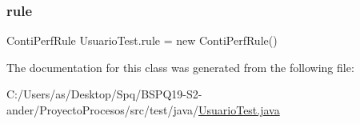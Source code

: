 \subsubsection{\texorpdfstring{rule}{rule}}
{\footnotesize\ttfamily Conti\+Perf\+Rule Usuario\+Test.\+rule = new Conti\+Perf\+Rule()}



The documentation for this class was generated from the following file\+:\begin{DoxyCompactItemize}
\item 
C\+:/\+Users/as/\+Desktop/\+Spq/\+B\+S\+P\+Q19-\/\+S2-\/ander/\+Proyecto\+Procesos/src/test/java/\mbox{\hyperlink{_usuario_test_8java}{Usuario\+Test.\+java}}\end{DoxyCompactItemize}
